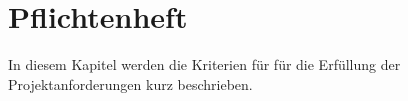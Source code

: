 \section{Pflichtenheft}
In diesem Kapitel werden die Kriterien für für die Erfüllung der Projektanforderungen kurz beschrieben.




